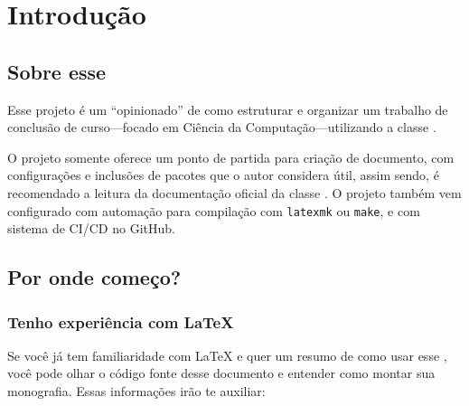 \chapter{Introdução}

\section{Sobre esse \template}

Esse projeto é um \template \enquote{opinionado} de como estruturar e organizar um trabalho de conclusão de curso---focado em Ciência da Computação---utilizando a classe \href{https://www.ctan.org/pkg/abntex2}{\abntex}.

O projeto somente oferece um ponto de partida para criação de documento, com configurações e inclusões de pacotes que o autor considera útil, assim sendo, é recomendado a leitura da documentação oficial da classe \abntex. O projeto também vem configurado com automação para compilação com \texttt{latexmk} ou \texttt{make}, e com sistema de CI/CD no GitHub.

\section{Por onde começo?}

\subsection{Tenho experiência com \LaTeX{}} \label{sub:tenho-xp-com-latex}

Se você já tem familiaridade com \LaTeX{} e quer um resumo de como usar esse \template, você pode olhar o código fonte desse documento e entender como montar sua monografia. Essas informações irão te auxiliar:

